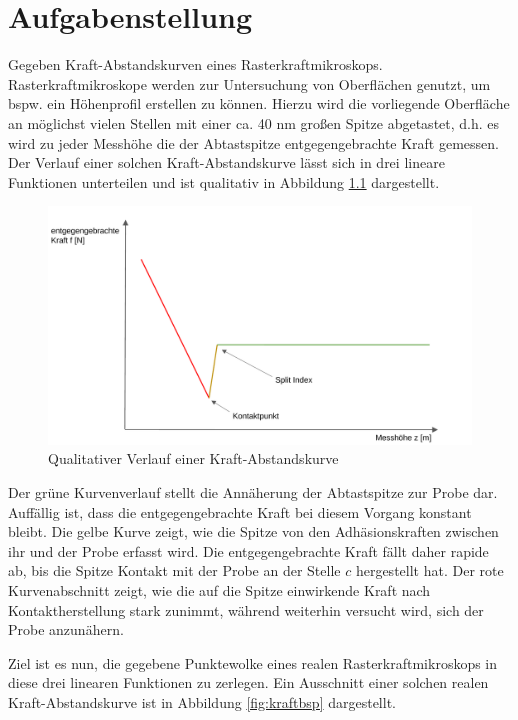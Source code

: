 \chapter{Aufgabenstellung}
Gegeben Kraft-Abstandskurven eines Rasterkraftmikroskops. Rasterkraftmikroskope werden zur Untersuchung von Oberflächen genutzt, um bspw. ein Höhenprofil erstellen zu können. Hierzu wird die vorliegende Oberfläche an möglichst vielen Stellen mit einer ca. 40 nm großen Spitze abgetastet, d.h. es wird zu jeder Messhöhe die der Abtastspitze entgegengebrachte Kraft gemessen.
Der Verlauf einer solchen Kraft-Abstandskurve lässt sich in drei lineare Funktionen unterteilen und ist qualitativ in Abbildung \ref{fig:kraftqual} dargestellt.

\begin{figure}[h!]
\centering
\includegraphics[scale=0.5]{qual.pdf}
\caption{Qualitativer Verlauf einer Kraft-Abstandskurve}
\label{fig:kraftqual}
\end{figure}

Der grüne Kurvenverlauf stellt die Annäherung der Abtastspitze zur Probe dar. Auffällig ist, dass die entgegengebrachte Kraft bei diesem Vorgang konstant bleibt.
Die gelbe Kurve zeigt, wie die Spitze von den Adhäsionskraften zwischen ihr und der Probe erfasst wird. Die entgegengebrachte Kraft fällt daher rapide ab, bis die Spitze Kontakt mit der Probe an der Stelle $c$ hergestellt hat.
Der rote Kurvenabschnitt zeigt, wie die auf die Spitze einwirkende Kraft nach Kontaktherstellung stark zunimmt, während weiterhin versucht wird, sich der Probe anzunähern.

Ziel ist es nun, die gegebene Punktewolke eines realen Rasterkraftmikroskops in diese drei linearen Funktionen zu zerlegen.
Ein Ausschnitt einer solchen realen Kraft-Abstandskurve ist in Abbildung \ref{fig:kraftbsp} dargestellt.


